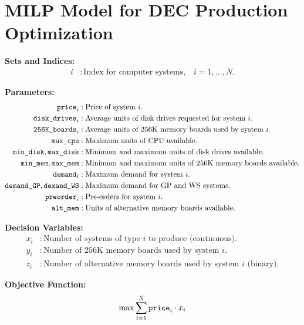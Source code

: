 \documentclass{article}
\begin{document}
\section*{MILP Model for DEC Production Optimization}

\textbf{Sets and Indices:}
\begin{align*}
    i & : \text{Index for computer systems,} \quad i = 1, \ldots, N.
\end{align*}

\textbf{Parameters:}
\begin{align*}
    \text{\texttt{price}}_i & : \text{Price of system } i. \\
    \text{\texttt{disk\_drives}}_i & : \text{Average units of disk drives requested for system } i. \\
    \text{\texttt{256K\_boards}}_i & : \text{Average units of 256K memory boards used by system } i. \\
    \text{\texttt{max\_cpu}} & : \text{Maximum units of CPU available.} \\
    \text{\texttt{min\_disk}}, \text{\texttt{max\_disk}} & : \text{Minimum and maximum units of disk drives available.} \\
    \text{\texttt{min\_mem}}, \text{\texttt{max\_mem}} & : \text{Minimum and maximum units of 256K memory boards available.} \\
    \text{\texttt{demand}}_i & : \text{Maximum demand for system } i. \\
    \text{\texttt{demand\_GP}}, \text{\texttt{demand\_WS}} & : \text{Maximum demand for GP and WS systems.} \\
    \text{\texttt{preorder}}_i & : \text{Pre-orders for system } i. \\
    \text{\texttt{alt\_mem}} & : \text{Units of alternative memory boards available.} \\
\end{align*}

\textbf{Decision Variables:}
\begin{align*}
    x_i & : \text{Number of systems of type } i \text{ to produce (continuous).} \\
    y_i & : \text{Number of 256K memory boards used by system } i. \\
    z_i & : \text{Number of alternative memory boards used by system } i \text{ (binary)}.
\end{align*}

\textbf{Objective Function:}
\[
\max \sum_{i=1}^{N} \text{\texttt{price}}_i \cdot x_i
\]
\end{document}
